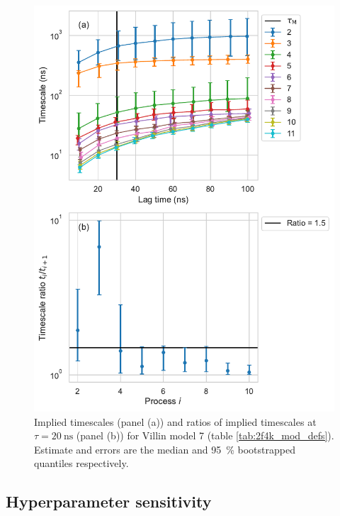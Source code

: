 \documentclass{article}
\begin{document}
\begin{figure}
    \centering
    \includegraphics[height=0.65\textheight]{figures/its/villin/Villin_model_dist._method_m2.pdf}
    \caption{Implied timescales (panel (a)) and ratios of implied timescales at $\tau=\SI{20}{\nano\second}$ (panel (b)) for Villin model 7 (table \ref{tab:2f4k_mod_defs}). Estimate and errors are the median and \SI{95}{\percent} bootstrapped quantiles respectively.}
    \label{fig:its_villin_7}
\end{figure}

\clearpage
\subsection{Hyperparameter sensitivity}
\end{document}
